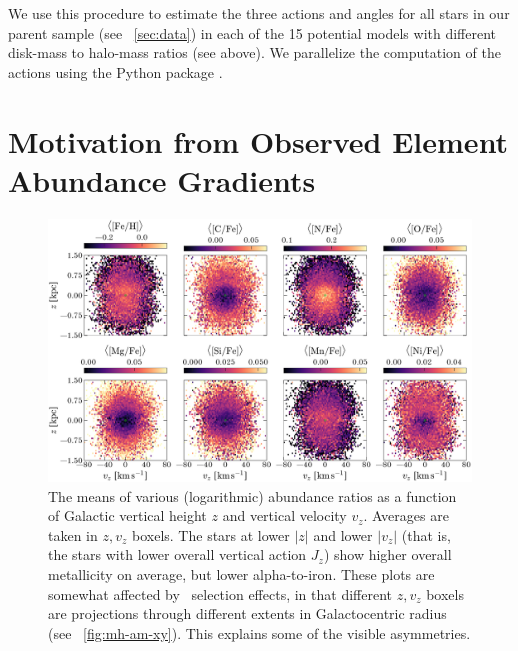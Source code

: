 \documentclass[modern]{aastex63}
\newcommand{\apogee}{\acronym{APOGEE}}
\begin{document}
We use this procedure to estimate the three actions and angles for all stars in
our parent sample (see \sectionname~\ref{sec:data}) in each of the 15 potential
models with different disk-mass to halo-mass ratios (see above).
We parallelize the computation of the actions using the Python package
 \citep{schwimmbad}.


\section{Motivation from Observed Element Abundance Gradients}
\label{sec:motivation}

\begin{figure}[!tp]
  \begin{center}
  \includegraphics[width=\textwidth]{abundance-zvz-grid.pdf}
  \end{center}
  \caption{%
    The means of various (logarithmic) abundance ratios as a function of
    Galactic vertical height $z$ and vertical velocity $v_z$.
    Averages are taken in $z, v_z$ boxels.
    The stars at lower $|z|$ and lower $|v_z|$ (that is, the stars with
    lower overall vertical action $J_z$) show higher overall metallicity
    on average, but lower alpha-to-iron.
    These plots are somewhat affected by \apogee\ selection effects, in
    that different $z, v_z$ boxels are projections through different extents
    in Galactocentric radius (see \figurename~\ref{fig:mh-am-xy}).
    This explains some of the visible asymmetries.
  \label{fig:zvz-grid}
  }
\end{figure}
\end{document}
